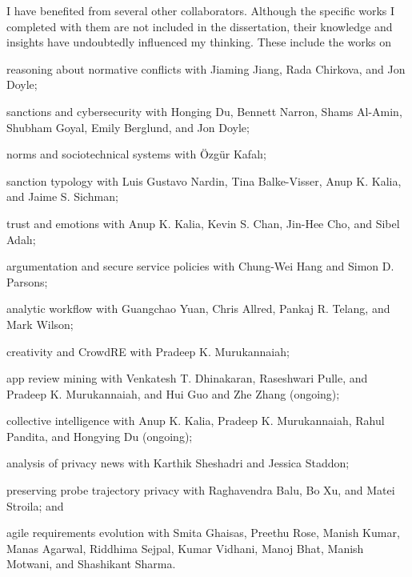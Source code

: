 \begin{acknowledgements}
I have benefited from several other collaborators. Although the
specific works I completed with them are not included in the
dissertation, their knowledge and insights have undoubtedly influenced
my thinking. These include the works on 
\begin{enumerate*}[label=(\arabic*)]
\item reasoning about normative conflicts \citep{Ajmeri-IJCAI16-Coco,Jiang-HotSoS16} with Jiaming Jiang, Rada Chirkova, and Jon Doyle; 
\item sanctions and cybersecurity \citep{Du-HotSoS15,Du-Acyse15} with Honging Du, Bennett Narron, Shams Al-Amin, Shubham Goyal, Emily Berglund, and Jon Doyle; 
\item norms and sociotechnical systems \citep{Kafali-IS16-Revani,Kafali-AAAI17-Kont} with {\"O}zg{\"u}r
Kafal{\i}; 
\item sanction typology \citep{Nardin-KER16-Classifying} with Luis Gustavo Nardin, Tina Balke-Visser, Anup K. Kalia, and Jaime S. Sichman; 
\item trust and emotions \citep{Kalia+14:Emotions} with Anup K. Kalia, Kevin S. Chan, Jin-Hee Cho, and Sibel Adal{\i};
\item argumentation and secure service policies \citep{Ajmeri-Computer17-Aragorn} with Chung-Wei Hang and Simon D. Parsons; 
\item analytic workflow \citep{Yuan-RCIS15} with Guangchao Yuan, Chris Allred, Pankaj R. Telang, and Mark Wilson; 
\item creativity and CrowdRE \citep{Murukannaiah-RE16-Creative,Murukannaiah-RE17-Data} with Pradeep K. Murukannaiah;
\item app review mining \citep{Dhinakaran-RE18-ActiveAppReview} with Venkatesh T. Dhinakaran, Raseshwari Pulle, and Pradeep K. Murukannaiah, and Hui Guo and Zhe Zhang (ongoing);
\item collective intelligence with Anup K. Kalia, Pradeep K. Murukannaiah, Rahul Pandita, and Hongying Du (ongoing);
\item analysis of privacy news \citep{Sheshadri-PST17-News} with Karthik Sheshadri and Jessica Staddon;
\item preserving probe trajectory privacy with Raghavendra Balu, Bo Xu, and Matei Stroila; and
\item agile requirements evolution \citep{Daneva-2013-AgileReqPrioritization,Ghaisas-2013-KRE} with Smita Ghaisas, Preethu Rose, Manish Kumar, Manas Agarwal, Riddhima Sejpal, Kumar Vidhani, Manoj Bhat, Manish Motwani, and Shashikant Sharma.
\end{enumerate*}


\end{acknowledgements}
